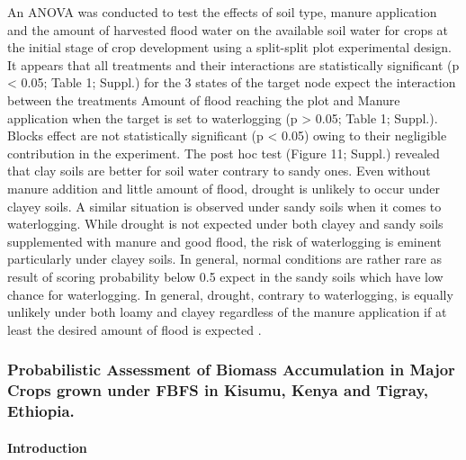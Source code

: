 \documentclass[11pt,preprint]{article}
\begin{document}
An ANOVA was conducted to test the effects of soil type, manure
application and the amount of harvested flood water on the available
soil water for crops at the initial stage of crop development using a
split-split plot experimental design. It appears that all treatments and
their interactions are statistically significant (p \textless{} 0.05;
Table 1; Suppl.) for the 3 states of the target node expect the
interaction between the treatments Amount of flood reaching the plot and
Manure application when the target is set to waterlogging (p
\textgreater{} 0.05; Table 1; Suppl.). Blocks effect are not
statistically significant (p \textless{} 0.05) owing to their negligible
contribution in the experiment. The post hoc test (Figure 11; Suppl.)
revealed that clay soils are better for soil water contrary to sandy
ones. Even without manure addition and little amount of flood, drought
is unlikely to occur under clayey soils. A similar situation is observed
under sandy soils when it comes to waterlogging. While drought is not
expected under both clayey and sandy soils supplemented with manure and
good flood, the risk of waterlogging is eminent particularly under
clayey soils. In general, normal conditions are rather rare as result of
scoring probability below 0.5 expect in the sandy soils which have low
chance for waterlogging. In general, drought, contrary to waterlogging,
is equally unlikely under both loamy and clayey regardless of the manure
application if at least the desired amount of flood is expected .

\hypertarget{probabilistic-assessment-of-biomass-accumulation-in-major-crops-grown-under-fbfs-in-kisumu-kenya-and-tigray-ethiopia.}{%
\subsubsection{Probabilistic Assessment of Biomass Accumulation in Major
Crops grown under FBFS in Kisumu, Kenya and Tigray,
Ethiopia.}\label{probabilistic-assessment-of-biomass-accumulation-in-major-crops-grown-under-fbfs-in-kisumu-kenya-and-tigray-ethiopia.}}

\hypertarget{introduction-2}{%
\paragraph{Introduction}\label{introduction-2}}
\end{document}
